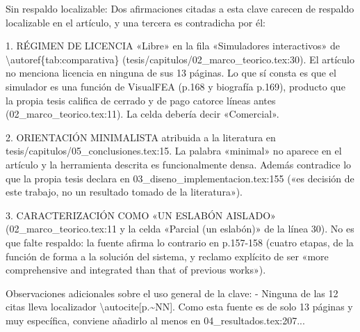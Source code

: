 \documentclass[11pt,a4paper]{article}
\newcommand{\campo}[1]{\textcolor{gris}{\footnotesize #1}}
\begin{document}
{\small\campo{Sin respaldo localizable:} Dos afirmaciones citadas a esta clave carecen de respaldo localizable en el artículo, y una tercera es contradicha por él:

1. RÉGIMEN DE LICENCIA «Libre» en la fila «Simuladores interactivos» de \textbackslash{}autoref\{tab:comparativa\} (tesis/capitulos/02\_marco\_teorico.tex:30). El artículo no menciona licencia en ninguna de sus 13 páginas. Lo que sí consta es que el simulador es una función de VisualFEA (p.168 y biografía p.169), producto que la propia tesis califica de cerrado y de pago catorce líneas antes (02\_marco\_teorico.tex:11). La celda debería decir «Comercial».

2. ORIENTACIÓN MINIMALISTA atribuida a la literatura en tesis/capitulos/05\_conclusiones.tex:15. La palabra «minimal» no aparece en el artículo y la herramienta descrita es funcionalmente densa. Además contradice lo que la propia tesis declara en 03\_diseno\_implementacion.tex:155 («es decisión de este trabajo, no un resultado tomado de la literatura»).

3. CARACTERIZACIÓN COMO «UN ESLABÓN AISLADO» (02\_marco\_teorico.tex:11 y la celda «Parcial (un eslabón)» de la línea 30). No es que falte respaldo: la fuente afirma lo contrario en p.157-158 (cuatro etapas, de la función de forma a la solución del sistema, y reclamo explícito de ser «more comprehensive and integrated than that of previous works»).

Observaciones adicionales sobre el uso general de la clave:
- Ninguna de las 12 citas lleva localizador \textbackslash{}autocite[p.\textasciitilde{}NN]. Como esta fuente es de solo 13 páginas y muy específica, conviene añadirlo al menos en 04\_resultados.tex:207...\par}
\end{document}
